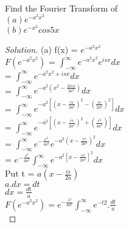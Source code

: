 \documentclass[12pt]{article}
\newenvironment{problem}[2][Problem]{\begin{trivlist}
\item[\hskip \labelsep {\bfseries #1}\hskip \labelsep {\bfseries #2.}]}{\end{trivlist}}
\begin{document}
\begin{problem}{8}
\text{ }\\
Find the Fourier Transform of\\
\noindent
    $( a )  e^{-a^2x^2}$\\
    $( b )  e^{-x^2}cos 5x$
  
\end{problem}
\begin{proof}[Solution]

(a)   f(x) = $e^{-a^2x^2}$\\
      
     $ F( e^{-a^2x^2}) $  =  $\int _{-\infty}^{\infty} e^{-a^2x^2}e^{isx}   dx$ \\
       
                          = $\int_{-\infty}^{\infty}e^{-a^2x^2+isx}dx$ \\
                         
                           = $\int_{-\infty}^{\infty} e^{-a^2(x^2-\frac{2isx}{2a^2})} dx $ \\
                         
                           = $\int_{-\infty}^{\infty} e^{-a^2 [(x-\frac{is}{2a^2})^2-(\frac{is}{2a^2})^2]} dx$  \\
                         
                           = $\int_{-\infty}^{\infty} e^{-a^2 [(x-\frac{is}{2a^2})^2+(\frac{s^2}{4a^4})]} dx$  \\
                         
                           = $\int_{-\infty}^{\infty} e^{-\frac{s^2}{4a^4}} e^{-a^2(x-\frac{is}{2a^2})^2} dx$  \\
                         
                           = $e^{-\frac{s^2}{4a^2}}\int_{-\infty}^{\infty} e^{-a^2[x-\frac{is}{2a^2}]^2} dx$   \\
          
               Put    t = $a (x-\frac{is}{2a})$ \\
               
                         $ a . dx = dt$ \\
                         
                         $ dx = \frac{dt}{a} $ \\
                         
         $ F(e^{-a^2x^2}) = e^{-\frac{s^2}{4a^2}} \int_{-\infty}^{\infty} e^{-t2} . \frac{dt}{a} $ \\
         

\end{proof}
\end{document}

